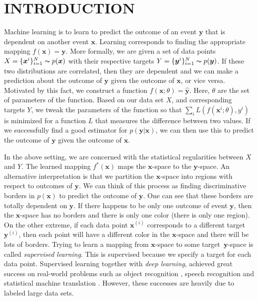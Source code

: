 \documentclass[a4paper,onesided,12pt]{report}
\begin{document}
\begin{abbreviations}
\end{abbreviations}


\chapter{INTRODUCTION}
\label{chapter:intro}
Machine learning is to learn to predict the outcome of an event $\boldsymbol{y}$ that is dependent on another event $\boldsymbol{x}$. Learning corresponds to finding the appropriate mapping $f(\boldsymbol{x})=\boldsymbol{y}$. More formally, we are given a set of data points $X=\{\boldsymbol{x}^i\}_{i=1}^{N}\thicksim p(\boldsymbol{x})$ with their respective targets $Y=\{\boldsymbol{y}^i\}_{i=1}^{N}\thicksim p(\boldsymbol{y})$. If these two distributions are correlated, then they are dependent and we can make a prediction about the outcome of $\boldsymbol{y}$ given the outcome of $\boldsymbol{x}$, or vice versa. Motivated by this fact, we construct a function $f(\boldsymbol{x}; \theta)=\hat{\boldsymbol{y}}$. Here, $\theta$ are the set of parameters of the function. Based on our data set $X$, and corresponding targets $Y$, we tweak the parameters of the function so that $\sum_i L(f(\boldsymbol{x}^i; \theta), y^i)$ is minimized for a function $L$ that measures the difference between two values. If we successfully find a good estimator for $p(\boldsymbol{y}|\boldsymbol{x})$, we can then use this to predict the outcome of $\boldsymbol{y}$ given the outcome of $\boldsymbol{x}$.

In the above setting, we are concerned with the statistical regularities between $X$ and $Y$. The learned mapping $f^{*}(\boldsymbol{x})$ maps the $\boldsymbol{x}$-space to the $\boldsymbol{y}$-space. An alternative interpretation is that we partition the $\boldsymbol{x}$-space into regions with respect to outcomes of $\boldsymbol{y}$. We can think of this process as finding discriminative borders in $p(\boldsymbol{x})$ to predict the outcome of $\boldsymbol{y}$. One can see that these borders are totally dependent on $\boldsymbol{y}$. If there happens to be only one outcome of event $\boldsymbol{y}$, then the $\boldsymbol{x}$-space has no borders and there is only one color (there is only one region). On the other extreme, if each data point $\boldsymbol{x}^{(i)}$ corresponds to a different target $\boldsymbol{y}^{(i)}$, then each point will have a different color in the $\boldsymbol{x}$-space and there will be lots of borders. Trying to learn a mapping from $\boldsymbol{x}$-space to some target~$\boldsymbol{y}$-space is called \emph{supervised learning}. This is supervised because we specify a target for each data point. Supervised learning together with \emph{deep learning}, achieved great success on real-world problems such as object recognition \cite{alexnet}, speech recognition \cite{acoustic} and statistical machine translation \cite{seq2seq}. However, these successes are heavily due to labeled large data sets.
\end{document}
